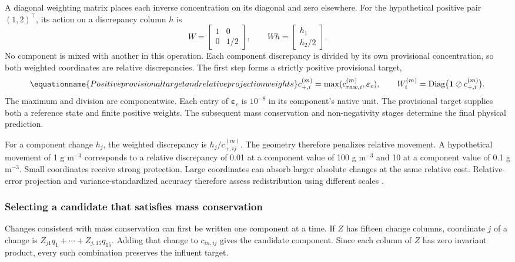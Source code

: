 A diagonal weighting matrix places each inverse concentration on its diagonal and zero elsewhere. For the hypothetical positive pair $(1,2)^\top$, its action on a discrepancy column $h$ is
\[
W=\begin{bmatrix}1&0\\0&1/2\end{bmatrix},\qquad
Wh=\begin{bmatrix}h_1\\h_2/2\end{bmatrix}.
\]
No component is mixed with another in this operation. Each component discrepancy is divided by its own provisional concentration, so both weighted coordinates are relative discrepancies. The first step forms a strictly positive provisional target,
\begin{equation}
\equationname{Positive provisional target and relative projection weights}
c_{+,i}^{(m)}=\max(c_{raw,i}^{(m)},\boldsymbol{\varepsilon}_c),\qquad
W_i^{(m)}=\operatorname{Diag}\bigl(\mathbf{1}\oslash c_{+,i}^{(m)}\bigr).
\label{eq:projection_positive_target}
\end{equation}
The maximum and division are componentwise. Each entry of $\boldsymbol{\varepsilon}_c$ is $10^{-8}$ in its component's native unit. The provisional target supplies both a reference state and finite positive weights. The subsequent mass conservation and non-negativity stages determine the final physical prediction.

For a component change $h_j$, the weighted discrepancy is $h_j/c_{+,ij}^{(m)}$. The geometry therefore penalizes relative movement. A hypothetical movement of 1 g m$^{-3}$ corresponds to a relative discrepancy of 0.01 at a component value of 100 g m$^{-3}$ and 10 at a component value of 0.1 g m$^{-3}$. Small coordinates receive strong protection. Large coordinates can absorb larger absolute changes at the same relative cost. Relative-error projection and variance-standardized accuracy therefore assess redistribution using different scales \citep{KircherVotsmeier2025,SturmSilva2024}.

\subsubsection{Selecting a candidate that satisfies mass conservation}

Changes consistent with mass conservation can first be written one component at a time. If $Z$ has fifteen change columns, coordinate $j$ of a change is $Z_{j1}q_1+\cdots+Z_{j,15}q_{15}$. Adding that change to $c_{in,ij}$ gives the candidate component. Since each column of $Z$ has zero invariant product, every such combination preserves the influent target.

